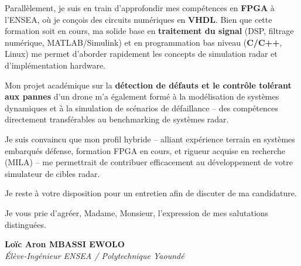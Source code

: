 \documentclass[a4paper,11pt]{article}
\begin{document}
Parallèlement, je suis en train d'approfondir mes compétences en \textbf{FPGA} à l'ENSEA, où je conçois des circuits numériques en \textbf{VHDL}. Bien que cette formation soit en cours, ma solide base en \textbf{traitement du signal} (DSP, filtrage numérique, MATLAB/Simulink) et en programmation bas niveau (\textbf{C/C++}, Linux) me permet d'aborder rapidement les concepts de simulation radar et d'implémentation hardware.

Mon projet académique sur la \textbf{détection de défauts et le contrôle tolérant aux pannes} d'un drone m'a également formé à la modélisation de systèmes dynamiques et à la simulation de scénarios de défaillance -- des compétences directement transférables au benchmarking de systèmes radar.

Je suis convaincu que mon profil hybride -- alliant expérience terrain en systèmes embarqués défense, formation FPGA en cours, et rigueur acquise en recherche (MILA) -- me permettrait de contribuer efficacement au développement de votre simulateur de cibles radar.

Je reste à votre disposition pour un entretien afin de discuter de ma candidature.

Je vous prie d'agréer, Madame, Monsieur, l'expression de mes salutations distinguées.

\vspace{0.8cm}

\textbf{Loïc Aron MBASSI EWOLO}\\
\textit{Élève-Ingénieur ENSEA / Polytechnique Yaoundé}
\end{document}
